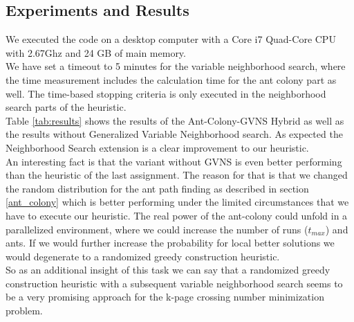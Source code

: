\documentclass{scrartcl}
\begin{document}
\subsection{Experiments and Results}
We executed the code on a desktop computer with a Core i7 Quad-Core
CPU with 2.67Ghz and 24 GB of main memory. \\


We have set a timeout to 5 minutes for the variable neighborhood search, where the time measurement includes the calculation time for the ant colony part as well. 
The time-based stopping criteria is
only executed in the neighborhood search parts of the heuristic.\\

Table \ref{tab:results} shows the results of the Ant-Colony-GVNS
Hybrid as well as the results without Generalized Variable
Neighborhood search.  As expected the Neighborhood Search extension is
a clear improvement to our heuristic. \\

An interesting fact is that the variant without GVNS is even better
performing than the heuristic of the last assignment. The reason for
that is that we changed the random distribution for the ant path
finding as described in section \ref{ant_colony} which is better
performing under the limited circumstances that we have to execute our
heuristic. The real power of the ant-colony could unfold in a
parallelized environment, where we could increase the number of runs
($t_{max}$) and ants.  If we would further increase the probability
for local better solutions we would degenerate to a randomized greedy
construction heuristic. \\

So as an additional insight of this task we can say that a randomized
greedy construction heuristic with a subsequent variable neighborhood
search seems to be a very promising approach for the k-page crossing
number minimization problem.
\end{document}
